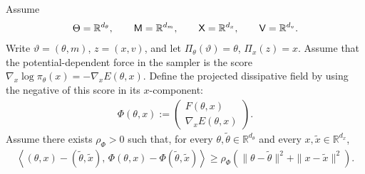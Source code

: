 \begin{assumption}
\label{ass:auxiliary_separation}
Assume
\begin{align*}
\Theta=\mathbb R^{d_\theta},
\qquad
{\mathsf{M}}=\mathbb R^{d_m},
\qquad
{\mathsf{X}}=\mathbb R^{d_x},
\qquad
{\mathsf{V}}=\mathbb R^{d_v}.
\end{align*}
Write
$\vartheta=(\theta,m)$, $z=(x,v)$, and let
$\Pi_\theta(\vartheta)=\theta$, $\Pi_x(z)=x$.
Assume that the potential-dependent force in the sampler is the score
$\nabla_x\log\pi_\theta(x)=-\nabla_xE(\theta,x)$.  Define the projected
dissipative field by using the negative of this score in its $x$-component:
\begin{align*}
\Phi(\theta,x):=
\begin{pmatrix}
F(\theta,x)\\
\nabla_xE(\theta,x)
\end{pmatrix}.
\end{align*}
Assume there exists $\rho_\Phi>0$ such that, for every
$\theta,\tilde\theta\in\mathbb R^{d_\theta}$ and every
$x,\tilde x\in\mathbb R^{d_x}$,
\begin{align*}
\left\langle
(\theta,x)-(\tilde\theta,\tilde x),\,
\Phi(\theta,x)-\Phi(\tilde\theta,\tilde x)
\right\rangle
\geq
\rho_\Phi
\left(
\|\theta-\tilde\theta\|^2+\|x-\tilde x\|^2
\right).
\end{align*}
\end{assumption}

